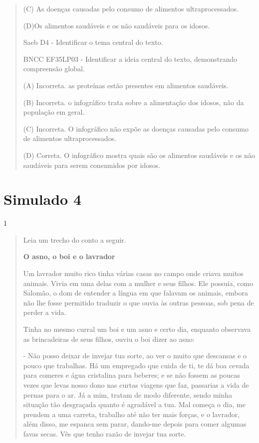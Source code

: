 \begin{escolha}
\begin{quote}
(C) As doenças causadas pelo consumo de alimentos ultraprocessados.

(D)Os alimentos saudáveis e os não saudáveis para os idosos.

Saeb D4 - Identificar o tema central do texto.

BNCC EF35LP03 - Identificar a ideia central do texto, demonstrando
compreensão global.

(A) Incorreta. as proteínas estão presentes em alimentos saudáveis.

(B) Incorreta. o infográfico trata sobre a alimentação dos idosos, não
da população em geral.

(C) Incorreta. O infográfico não expõe as doenças causadas pelo consumo
de alimentos ultraprocessados.

(D) Correta. O infográfico mostra quais são os alimentos saudáveis e os
não saudáveis para serem consumidos por idosos.
\end{quote}

\chapter{Simulado 4}

\num{1}

\begin{quote}
Leia um trecho do conto a seguir.

\textbf{O asno, o boi e o lavrador}

Um lavrador muito rico tinha várias casas no campo onde criava muitos
animais. Vivia em uma delas com a mulher e seus filhos. Ele possuía,
como Salomão, o dom de entender a língua em que falavam os animais,
embora não lhe fosse permitido traduzir o que ouvia às outras pessoas,
sob pena de perder a vida.

Tinha no mesmo curral um boi e um asno e certo dia, enquanto observava
as brincadeiras de seus filhos, ouviu o boi dizer ao asno:

- Não posso deixar de invejar tua sorte, ao ver o muito que descansas e
o pouco que trabalhas. Há um empregado que cuida de ti, te dá boa cevada
para comeres e água cristalina para beberes; e se não fossem as poucas
vezes que levas nosso dono nas curtas viagens que faz, passarias a vida
de pernas para o ar. Já a mim, tratam de modo diferente, sendo minha
situação tão desgraçada quanto é agradável a tua. Mal começa o dia, me
prendem a uma carreta, trabalho até não ter mais forças, e o lavrador,
além disso, me espanca sem parar, dando-me depois para comer algumas
favas secas. Vês que tenho razão de invejar tua sorte.


\end{quote}
\end{escolha}

